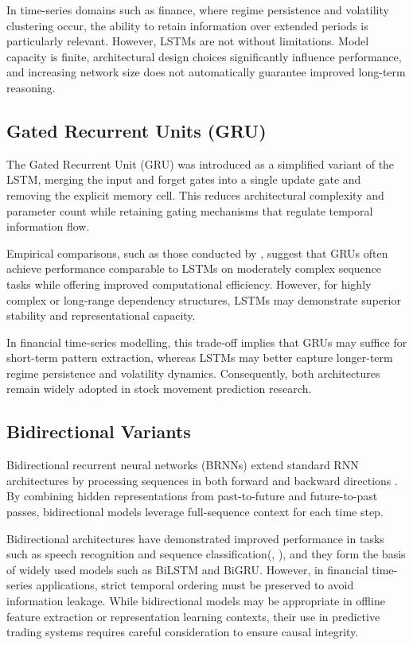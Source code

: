 \documentclass{l4proj}
\begin{document}
In time-series domains such as finance, where regime persistence and volatility clustering occur, the ability to retain information over extended periods is particularly relevant. However, LSTMs are not without limitations. Model capacity is finite, architectural design choices significantly influence performance, and increasing network size does not automatically guarantee improved long-term reasoning.

\subsection{Gated Recurrent Units (GRU)}

The Gated Recurrent Unit (GRU) was introduced as a simplified variant of the LSTM, merging the input and forget gates into a single update gate and removing the explicit memory cell. This reduces architectural complexity and parameter count while retaining gating mechanisms that regulate temporal information flow.

Empirical comparisons, such as those conducted by \citet{Cahuantzi_2023}, suggest that GRUs often achieve performance comparable to LSTMs on moderately complex sequence tasks while offering improved computational efficiency. However, for highly complex or long-range dependency structures, LSTMs may demonstrate superior stability and representational capacity.

In financial time-series modelling, this trade-off implies that GRUs may suffice for short-term pattern extraction, whereas LSTMs may better capture longer-term regime persistence and volatility dynamics. Consequently, both architectures remain widely adopted in stock movement prediction research.

\subsection{Bidirectional Variants}

Bidirectional recurrent neural networks (BRNNs) extend standard RNN architectures by processing sequences in both forward and backward directions \citep{650093}. By combining hidden representations from past-to-future and future-to-past passes, bidirectional models leverage full-sequence context for each time step.

Bidirectional architectures have demonstrated improved performance in tasks such as speech recognition and sequence classification(\cite{GRAVES2005602}, \cite{huang2015bidirectionallstmcrfmodelssequence}), and they form the basis of widely used models such as BiLSTM and BiGRU. However, in financial time-series applications, strict temporal ordering must be preserved to avoid information leakage. While bidirectional models may be appropriate in offline feature extraction or representation learning contexts, their use in predictive trading systems requires careful consideration to ensure causal integrity.
\end{document}
